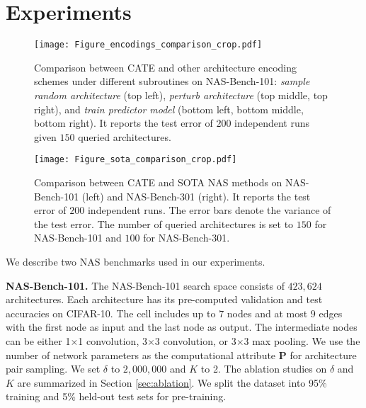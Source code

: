 \section{Experiments}
\label{sec.experiments} 


\begin{figure*}[t]
	\centering
	\texttt{[image: Figure\_encodings\_comparison\_crop.pdf]}
\caption{Comparison between CATE and other architecture encoding schemes under different subroutines on NAS-Bench-101: \emph{sample random architecture} (top left), \emph{perturb architecture} (top middle, top right), and \emph{train predictor model}
(bottom left, bottom middle, bottom right). It reports the test error of $200$ independent runs given $150$ queried architectures.}
	\label{fig.nas_encodings_comprison}
\end{figure*}

\begin{figure*}[t]
	\centering
	\texttt{[image: Figure\_sota\_comparison\_crop.pdf]}
\caption{Comparison between CATE and SOTA NAS methods on NAS-Bench-101 (left) and NAS-Bench-301 (right). It reports the test error of $200$ independent runs. The error bars denote the variance of the test error. The number of queried architectures is set to $150$ for NAS-Bench-101 and $100$ for NAS-Bench-301.}
	\label{fig.nas_sota_comprison}
\end{figure*}

We describe two NAS benchmarks used in our experiments.

\textbf{NAS-Bench-101.}
The NAS-Bench-101 search space \cite{pmlr-v97-ying19a} consists of  $423,624$ architectures. Each architecture has its pre-computed validation and test accuracies on CIFAR-10. The cell includes up to $7$ nodes and at most $9$ edges with the first node as input and the last node as output. The intermediate nodes can be either 1$\times$1 convolution, 3$\times$3 convolution, or 3$\times$3 max pooling. We use the number of network parameters as the computational attribute $\mathbf{P}$ for architecture pair sampling. We set $\delta$ to $2,000,000$ and $K$ to 2. The ablation studies on $\delta$ and $K$ are summarized in Section \ref{sec:ablation}. We split the dataset into 95\% training and 5\% held-out test sets for pre-training.

